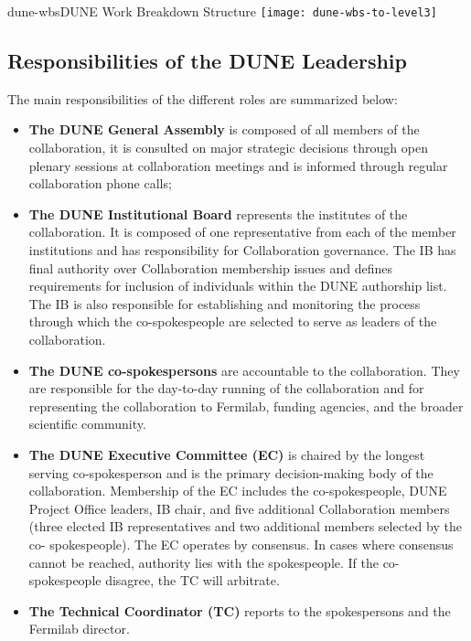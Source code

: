 \begin{cdrfigure}{dune-wbs}{DUNE Work Breakdown Structure}
  \texttt{[image: dune-wbs-to-level3]}
\end{cdrfigure}

\subsection{Responsibilities of the DUNE Leadership}

The main responsibilities of the different roles are summarized below:
\begin{itemize}
  \item \textbf{The DUNE General Assembly} is composed of all members of the collaboration, it is consulted on major strategic decisions 
    through open plenary sessions at collaboration meetings and is informed through regular collaboration phone calls;
  \item \textbf{The DUNE Institutional Board} represents the institutes of the collaboration. It is composed of one representative from each 
    of the member institutions and has responsibility for Collaboration governance.  The IB has final authority over Collaboration 
    membership issues and defines requirements for inclusion of individuals within the DUNE authorship list. The IB is also responsible    
    for establishing and monitoring the process through which the co-spokespeople are selected to serve as leaders of the collaboration.   
  \item \textbf{The DUNE co-spokespersons} are accountable to the collaboration. They 
    are responsible for the day-to-day running of the collaboration and for representing the collaboration to Fermilab, funding 
    agencies, and the broader scientific community.
  \item \textbf{The DUNE Executive Committee (EC)} is chaired by the longest serving co-spokesperson and is the primary 
    decision-making body of the collaboration. Membership of the EC includes the co-spokespeople, DUNE Project Office leaders, IB 
    chair, and five additional Collaboration members (three elected IB representatives and two additional members selected by the co-
    spokespeople). The EC operates by consensus. In cases where consensus cannot be reached, 
    authority lies with the spokespeople. If the co-spokespeople disagree, the TC will arbitrate.
  \item \textbf{The Technical Coordinator (TC)} reports to the spokespersons and the Fermilab director. 

\end{itemize}
